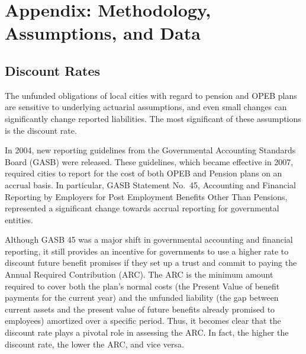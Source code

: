 \documentclass[12pt]{article}
\begin{document}
\section{Appendix: Methodology, Assumptions, and Data}
\subsection{Discount
Rates}

The unfunded obligations of local cities with regard to pension and OPEB
plans are sensitive to underlying actuarial assumptions, and even small
changes can significantly change reported liabilities. The most
significant of these assumptions is the discount rate.

In 2004, new reporting guidelines from the Governmental Accounting
Standards Board (GASB) were released. These guidelines, which became
effective in 2007, required cities to report for the cost of both OPEB
and Pension plans on an accrual basis. In particular, GASB Statement
No.~45, Accounting and Financial Reporting by Employers for
Post Employment Benefits Other Than Pensions, represented a significant
change towards accrual reporting for governmental entities.

Although GASB 45 was a major shift in governmental accounting and
financial reporting, it still provides an incentive for governments to
use a higher rate to discount future benefit promises if they set up a
trust and commit to paying the Annual Required Contribution (ARC). The
ARC is the minimum amount required to cover both the plan's normal costs
(the Present Value of benefit payments for the current year) and the
unfunded liability (the gap between current assets and the present value
of future benefits already promised to employees) amortized over a
specific period. Thus, it becomes clear that the discount rate plays a
pivotal role in assessing the ARC. In fact, the higher the discount
rate, the lower the ARC, and vice versa.

\begin{figure}[h]
  \label{fig:key}
\end{figure}
\end{document}
